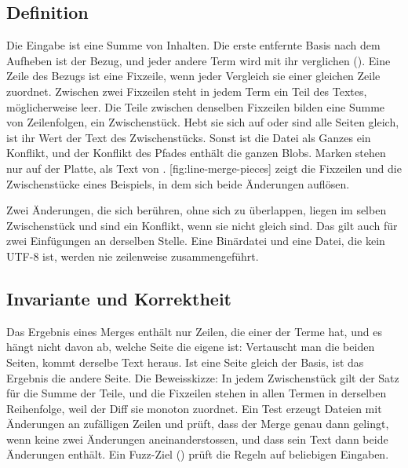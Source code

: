 \subsection{Definition}

Die Eingabe ist eine Summe von Inhalten. Die erste entfernte Basis nach dem Aufheben ist der Bezug,
und jeder andere Term wird mit ihr verglichen ().
Eine Zeile des Bezugs ist eine Fixzeile, wenn jeder Vergleich sie einer gleichen Zeile zuordnet.
Zwischen zwei Fixzeilen steht in jedem Term ein Teil des Textes, möglicherweise leer.
Die Teile zwischen denselben Fixzeilen bilden eine Summe von Zeilenfolgen, ein Zwischenstück.
Hebt sie sich auf oder sind alle Seiten gleich, ist ihr Wert der Text des Zwischenstücks.
Sonst ist die Datei als Ganzes ein Konflikt, und der Konflikt des Pfades enthält die ganzen Blobs.
Marken stehen nur auf der Platte, als Text von .
[fig:line-merge-pieces] zeigt die Fixzeilen und die Zwischenstücke
eines Beispiels, in dem sich beide Änderungen auflösen.

\startplacefigure[title={Fixzeilen und Zwischenstücke beim Merge der Zeilen},
    reference=fig:line-merge-pieces,location=here]
\stopplacefigure

Zwei Änderungen, die sich berühren, ohne sich zu überlappen, liegen im selben Zwischenstück
und sind ein Konflikt, wenn sie nicht gleich sind.
Das gilt auch für zwei Einfügungen an derselben Stelle.
Eine Binärdatei und eine Datei, die kein UTF-8 ist, werden nie zeilenweise zusammengeführt.

\subsection{Invariante und Korrektheit}

Das Ergebnis eines Merges enthält nur Zeilen, die einer der Terme hat,
und es hängt nicht davon ab, welche Seite die eigene ist: Vertauscht man die beiden Seiten,
kommt derselbe Text heraus. Ist eine Seite gleich der Basis, ist das Ergebnis die andere Seite.
Die Beweisskizze: In jedem Zwischenstück gilt der Satz für die Summe der Teile,
und die Fixzeilen stehen in allen Termen in derselben Reihenfolge,
weil der Diff sie monoton zuordnet.
Ein Test erzeugt Dateien mit Änderungen an zufälligen Zeilen
und prüft, dass der Merge genau dann gelingt, wenn keine zwei Änderungen aneinanderstossen,
und dass sein Text dann beide Änderungen enthält.
Ein Fuzz-Ziel () prüft die Regeln auf beliebigen Eingaben.

